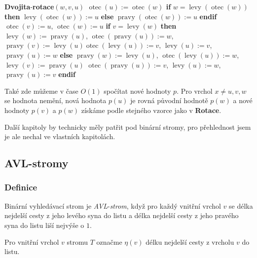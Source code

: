 \documentclass[a4paper,12pt]{article}
\DeclareMathOperator*{\otec}{otec}
\DeclareMathOperator*{\levy}{levy}
\DeclareMathOperator*{\pravy}{pravy}
\newcommand{\algoritmus}[1]{
  {
  \setlength\fboxrule{0.5pt}

  \begin{boxedminipage}{0.8\textwidth}

 #1
  \end{boxedminipage}

  }
  }
\begin{document}
\algoritmus{
{\bf Dvojita}-{\bf rotace$(w,v,u)$\newline 
$\otec(u):=\otec(w)$\newline 
\textsf{if}} $w=\levy(\otec(w))$ {\bf \textsf{then}}\newline 
\phantom{---}$\levy(\otec(w)):=u$\newline 
{\bf \textsf{else}}\newline 
\phantom{---}$\pravy(\otec(w)):=u$\newline 
{\bf \textsf{endif}}\newline 
$\otec(v):=u$, $\otec(w):=u$\newline 
{\bf \textsf{if}} $v=\levy(w)$ {\bf \textsf{then}}\newline  
\phantom{---}$\levy(w):=\pravy(u)$, $\otec(\pravy(u)):=w$, $\pravy(v):=\levy(u)$\newline \phantom{---}$\otec(\levy(u)):=v$, $\levy(u):=v$, $\pravy(u):=w$\newline 
{\bf \textsf{else}}\newline 
\phantom{---}$\pravy(w):=\levy(u)$, $\otec(\levy(u)):=w$, $\levy(v):=\pravy(u)$\newline 
\phantom{---}$\otec(\pravy(u)):=v$, $\levy(u):=w$, $\pravy(u):=v$\newline 
{\bf \textsf{endif}}
}

Také zde můžeme v čase $O(1)$ spočítat nové hodnoty $
p$. 
Pro vrchol $x\ne u,v,w$ se hodnota nemění, nová hodnota 
$p(u)$ je 
rovná původní hodnotě $p(w)$ a nové hodnoty $
p(v)$ 
a $p(w)$ 
získáme pod\-le stejného vzorce  jako v {\bf Rotace}.

Další kapitoly by technicky měly patřit pod binární stromy, pro přehlednost jsem je ale nechal ve vlastních kapitolách.

\subsection{AVL-stromy}

\subsubsection{Definice}

Binární vyhledávací strom je 
\emph{AVL}-\emph{strom}, když pro každý vnitř\-ní vrchol 
$v$ se délka nejdelší cesty z jeho levého syna do 
listu a délka nejdelší cesty z jeho pravého syna do listu 
liší nejvýše o $1$.  

Pro vnitřní vrchol $v$ stromu $T$ označme $\eta 
(v)$ 
délku nejdelší cesty z vrcholu $v$ do listu.
\end{document}
